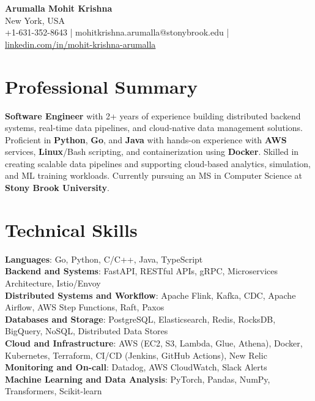 \documentclass[letterpaper,11pt]{article}
\begin{document}
\begin{center}
  {\Large \textbf{Arumalla Mohit Krishna}} \\
  New York, USA \\
  +1-631-352-8643 \enspace | \enspace mohitkrishna.arumalla@stonybrook.edu \enspace | \enspace \href{https://www.linkedin.com/in/mohit-krishna-arumalla}{linkedin.com/in/mohit-krishna-arumalla}
\end{center}

\section{Professional Summary}
  \begin{itemize}[leftmargin=0.15in, label={}]
    \small{\item{
     \textbf{Software Engineer} with 2+ years of experience building distributed backend systems, real-time data pipelines, and cloud-native data management solutions. Proficient in \textbf{Python}, \textbf{Go}, and \textbf{Java} with hands-on experience with \textbf{AWS} services, \textbf{Linux}/Bash scripting, and containerization using \textbf{Docker}. Skilled in creating scalable data pipelines and supporting cloud-based analytics, simulation, and ML training workloads. Currently pursuing an MS in Computer Science at \textbf{Stony Brook University}.
    }}
  \end{itemize}
\vspace{-16pt}

\section{Technical Skills}
 \begin{itemize}[leftmargin=0.15in, label={}]
    \small{\item{
     \textbf{Languages}: Go, Python, C/C++, Java, TypeScript \\
     \textbf{Backend and Systems}: FastAPI, RESTful APIs, gRPC, Microservices Architecture, Istio/Envoy \\
     \textbf{Distributed Systems and Workflow}: Apache Flink, Kafka, CDC, Apache Airflow, AWS Step Functions, Raft, Paxos \\
     \textbf{Databases and Storage}: PostgreSQL, Elasticsearch, Redis, RocksDB, BigQuery, NoSQL, Distributed Data Stores \\
     \textbf{Cloud and Infrastructure}: AWS (EC2, S3, Lambda, Glue, Athena), Docker, Kubernetes, Terraform, CI/CD (Jenkins, GitHub Actions), New Relic \\
     \textbf{Monitoring and On-call}: Datadog, AWS CloudWatch, Slack Alerts \\
     \textbf{Machine Learning and Data Analysis}: PyTorch, Pandas, NumPy, Transformers, Scikit-learn
    }}
 \end{itemize}
\vspace{-16pt}
\end{document}
